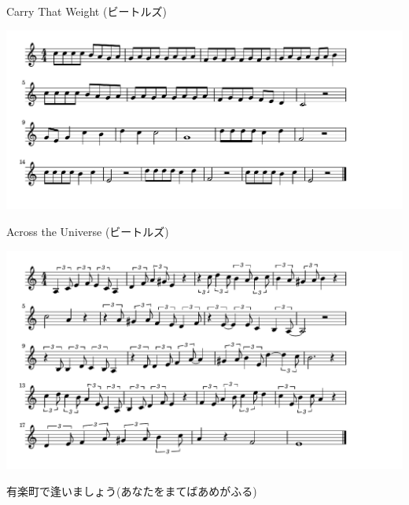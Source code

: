 \documentclass[a4paper]{ltjsarticle}
\begin{document}
\vspace{-10mm} \hspace{10mm}
Carry That Weight (ビートルズ)

\includegraphics[clip]{acrossuniverse_crop.pdf}

\vspace{-10mm} \hspace{10mm}
Across the Universe (ビートルズ)

\includegraphics[clip]{yurakucho_crop.pdf}

\vspace{-10mm} \hspace{10mm}
有楽町で逢いましょう(あなたをまてばあめがふる)
\end{document}
